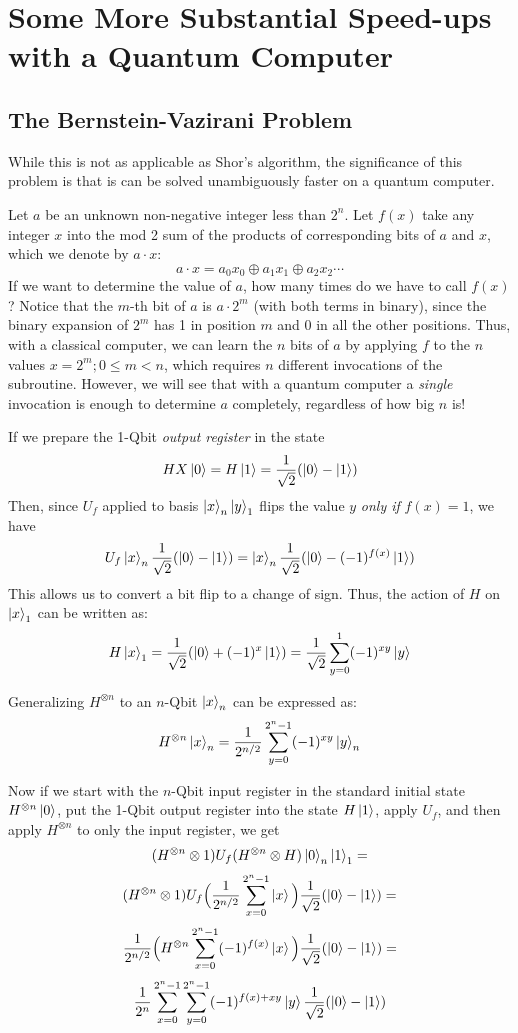 \documentclass[letterpaper]{article}
\begin{document}
\section{Some More Substantial Speed-ups with a Quantum Computer} 
\subsection{The Bernstein-Vazirani Problem}

While this is not as applicable as Shor's algorithm, the significance of this problem is that is can be solved unambiguously faster on a quantum computer. 

Let $a$ be an unknown non-negative integer less than $2^{n}$. Let $f(x)$ take any integer $x$ into the mod 2 sum of the products of corresponding bits of $a$ and $x$, which we denote by $a \cdot x$: 
$$ a \cdot x = a_{0}x_{0} \oplus a_{1}x_{1} \oplus a_{2}x_{2} \cdots $$
If we want to determine the value of $a$, how many times do we have to call $f(x)$?
Notice that the $m$-th bit of $a$ is $a \cdot 2^{m}$ (with both terms in binary), since the binary expansion of $2^{m}$ has 1 in position $m$ and 0 in all the other positions. Thus, with a classical computer, we can learn the $n$ bits of $a$ by applying $f$ to the $n$ values $x = 2^{m}; 0 \leq m < n$, which requires $n$ different invocations of the subroutine. However, we will see that with a quantum computer a \textsl{single} invocation is enough to determine $a$ completely, regardless of how big $n$ is!

If we prepare the 1-Qbit \textsl{output register} in the state $$HX\ket{0} = H\ket{1} = \frac{1}{\sqrt{2}}(\ket{0} - \ket{1})$$
Then, since $U_{f}$ applied to basis $\ket{x}_{n}\ket{y}_{1}$ flips the value $y$ \textsl{only if} $f(x) = 1$, we have 
$$U_{f}\ket{x}_{n} \frac{1}{\sqrt{2}} (\ket{0} - \ket{1}) =  \ket{x}_{n} \frac{1}{\sqrt{2}} (\ket{0} - (-1)^{f(x)}\ket{1}) $$
This allows us to convert a bit flip to a change of sign. Thus, the action of $H$ on $\ket{x}_{1}$ can be written as: 
$$ H\ket{x}_{1} = \frac{1}{\sqrt{2}} (\ket{0} + (-1)^{x} \ket{1}) = \frac{1}{\sqrt{2}} \sum^{1}_{y=0} (-1)^{xy} \ket{y} $$

Generalizing $H^{\otimes n}$ to an $n$-Qbit $\ket{x}_{n}$ can be expressed as:
$$H^{\otimes n} \ket{x}_{n} = \frac{1}{2^{n/2}} \sum_{y=0}^{2^{n} - 1} (-1)^{xy} \ket{y}_{n}$$

Now if we start with the $n$-Qbit input register in the standard initial state $H^{\otimes n} \ket{0}$, put the 1-Qbit output register into the state $H\ket{1}$, apply $U_{f}$, and then apply $H^{\otimes n}$ to only the input register, we get 
$$ (H^{\otimes n} \otimes 1)U_{f}(H^{\otimes n} \otimes H)\ket{0}_{n} \ket{1}_{1} = $$
$$ (H^{\otimes n} \otimes 1)U_{f} \Big( \frac{1}{2^{n/2}} \sum_{x=0}^{2^{n} - 1} \ket{x} \Big) \frac{1}{\sqrt{2}} (\ket{0} - \ket{1}) =  $$
$$ \frac{1}{2^{n/2}} \Big( H^{\otimes n}\sum_{x=0}^{2^{n} - 1} (-1)^{f(x)} \ket{x} \Big) \frac{1}{\sqrt{2}} (\ket{0} - \ket{1}) = $$
$$ \frac{1}{2^{n}} \sum_{x=0}^{2^{n} - 1} \sum_{y=0}^{2^{n} - 1} (-1)^{f(x) + xy} \ket{y} \frac{1}{\sqrt{2}} (\ket{0} - \ket{1}) $$
\end{document}
